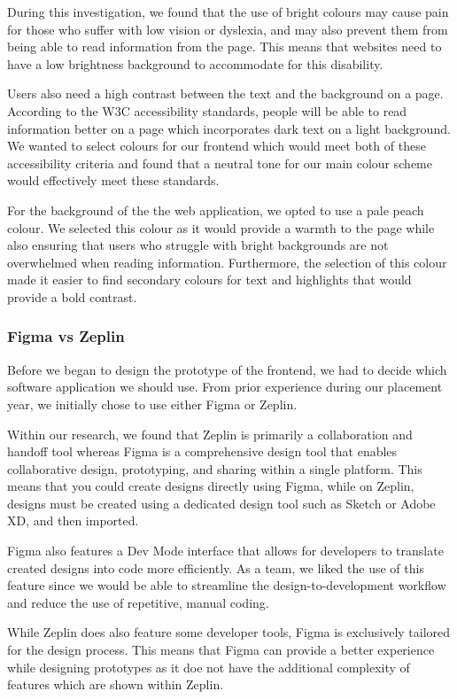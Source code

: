 \documentclass{article}
\begin{document}
During this investigation, we found that the use of bright colours may cause pain for those who suffer with low vision or dyslexia, and may also prevent them from being able to read information from the page. This means that websites need to have a low brightness background to accommodate for this disability.

Users also need a high contrast between the text and the background on a page. According to the W3C accessibility standards, people will be able to read information better on a page which incorporates dark text on a light background. We wanted to select colours for our frontend which would meet both of these accessibility criteria and found that a neutral tone for our main colour scheme would effectively meet these standards.

For the background of the the web application, we opted to use a pale peach colour. We selected this colour as it would provide a warmth to the page while also ensuring that users who struggle with bright backgrounds are not overwhelmed when reading information. Furthermore, the selection of this colour made it easier to find secondary colours for text and highlights that would provide a bold contrast.

\subsubsection{Figma vs Zeplin}
Before we began to design the prototype of the frontend, we had to decide which software application we should use. From prior experience during our placement year, we initially chose to use either Figma or Zeplin.

Within our research, we found that Zeplin is primarily a collaboration and handoff tool whereas Figma is a comprehensive design tool that enables collaborative design, prototyping, and sharing within a single platform. This means that you could create designs directly using Figma, while on Zeplin, designs must be created using a dedicated design tool such as Sketch or Adobe XD, and then imported. 

Figma also features a Dev Mode interface that allows for developers to translate created designs into code more efficiently. As a team, we liked the use of this feature since we would be able to streamline the design-to-development workflow and reduce the use of repetitive, manual coding.

While Zeplin does also feature some developer tools, Figma is exclusively tailored for the design process. This means that Figma can provide a better experience while designing prototypes as it doe not have the additional complexity of features which are shown within Zeplin. 
\end{document}
